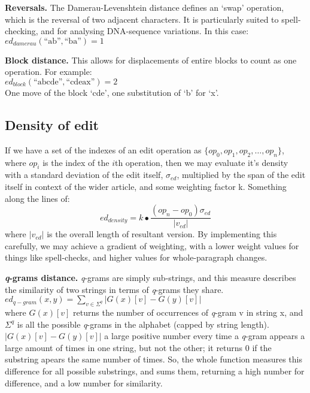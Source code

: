 \textbf{Reversals.} The Damerau-Levenshtein distance defines an `swap'
operation, which is the reversal of two adjacent characters. It is
particularly suited to spell-checking, and for analysing DNA-sequence
variations. In this case:\\ $ed_{damerau}(\text{``ab''},\text{``ba''})
= 1$

\textbf{Block distance.} This allows for displacements of entire
blocks to count as one operation. For
example:\\ $ed_{block}(\text{``abcde''},\text{``cdeax''})= 2$ \\ One
move of the block `cde', one substitution of `b' for
`x'.\cite{Tichy1984}

\subsection*{Density of edit}

If we have a set of the indexes of an edit operation as
$\{op_0,op_1,op_2,\dots, op_n\}$, where $op_i$ is the index of the
$i$th operation, then we may evaluate it's density with a standard
deviation of the edit itself, $\sigma_{ed}$, multiplied by the span of
the edit itself in context of the wider article, and some weighting
factor k. Something along the lines of:
$$ed_{density} = k\bullet\frac{(op_n - op_0)\sigma_{ed}}{|v_{ed}|}$$
where $|v_{ed}|$ is the overall length of resultant version. By
implementing this carefully, we may achieve a gradient of weighting,
with a lower weight values for things like spell-checks, and higher
values for whole-paragraph changes.

\textbf{\textit{q}-grams distance.} \textit{q}-grams are simply
sub-strings, and this measure describes the similarity of two strings
in terms of \textit{q}-grams they
share.\cite{Ukkonen1992}\\ $ed_{q-gram}(x,y)=\sum\limits_{v\in\Sigma
  ^q}|G(x)[v]-G(y)[v]|$\\ where $G(x)[v]$ returns the number of
occurrences of \textit{q}-gram v in string x, and $\Sigma ^q$ is all
the possible \textit{q}-grams in the alphabet (capped by string
length). $|G(x)[v]-G(y)[v]|$ a large positive number every time a
\textit{q}-gram appears a large amount of times in one string, but not
the other; it returns 0 if the substring apears the same number of
times. So, the whole function measures this difference for all
possible substrings, and sums them, returning a high number for
difference, and a low number for similarity.



